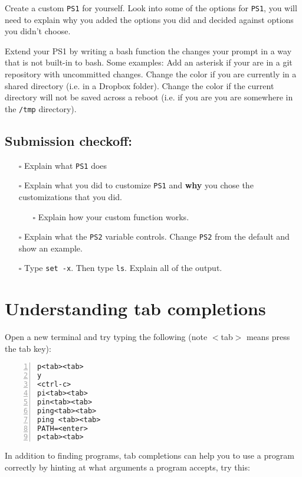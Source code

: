 \documentclass{article}
\begin{document}
\medskip
\noindent
Create a custom \texttt{PS1} for yourself. Look into some of the options for
\texttt{PS1}, you will need to explain why you added the options you did and
decided against options you didn't choose.

\medskip
\noindent
Extend your PS1 by writing a bash function the changes your prompt in a way
that is not built-in to bash. Some examples: Add an asterisk if your are in a
git repository with uncommitted changes. Change the color if you are currently
in a shared directory (i.e. in a Dropbox folder). Change the color if the
current directory will not be saved across a reboot (i.e. if you are you are
somewhere in the \texttt{/tmp} directory).

\subsection*{Submission checkoff:}
\begin{itemize}
  \item[$\square$] Explain what \texttt{PS1} does
  \item[$\square$] Explain what you did to customize \texttt{PS1} and
    \textbf{why} you chose the customizations that you did.
    \begin{itemize}
      \item[$\square$] Explain how your custom function works.
    \end{itemize}
  \item[$\square$] Explain what the \texttt{PS2} variable controls. Change
    \texttt{PS2} from the default and show an example.
  \item[$\square$] Type \texttt{set -x}. Then type \texttt{ls}. Explain
    all of the output.
\end{itemize}


\section{Understanding tab completions}

\medskip
\noindent
Open a new terminal and try typing the following (note $<$tab$>$ means press
the tab key):

\begin{lstlisting}[numbers=left]
p<tab><tab>
y
<ctrl-c>
pi<tab><tab>
pin<tab><tab>
ping<tab><tab>
ping <tab><tab>
PATH=<enter>
p<tab><tab>
\end{lstlisting}

\medskip
\noindent
In addition to finding programs, tab completions can help you to use a program
correctly by hinting at what arguments a program accepts, try this:
\end{document}
